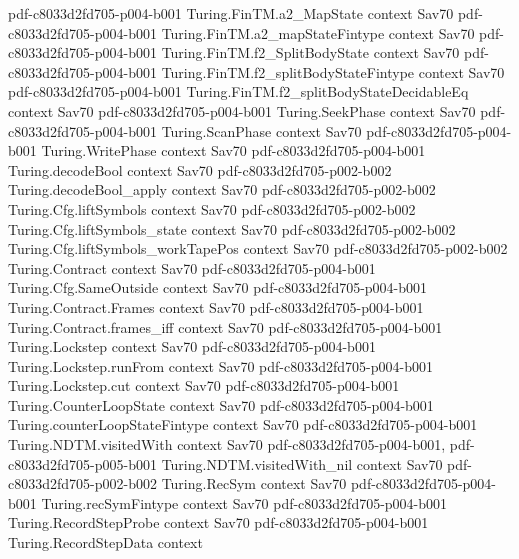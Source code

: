 \begin{theorem}
  {pdf-c8033d2fd705-p004-b001}
\proofstep
  {Turing.FinTM.a2_MapState}
  {context}
  {Sav70}
  {pdf-c8033d2fd705-p004-b001}
\proofstep
  {Turing.FinTM.a2_mapStateFintype}
  {context}
  {Sav70}
  {pdf-c8033d2fd705-p004-b001}
\proofstep
  {Turing.FinTM.f2_SplitBodyState}
  {context}
  {Sav70}
  {pdf-c8033d2fd705-p004-b001}
\proofstep
  {Turing.FinTM.f2_splitBodyStateFintype}
  {context}
  {Sav70}
  {pdf-c8033d2fd705-p004-b001}
\proofstep
  {Turing.FinTM.f2_splitBodyStateDecidableEq}
  {context}
  {Sav70}
  {pdf-c8033d2fd705-p004-b001}
\proofstep
  {Turing.SeekPhase}
  {context}
  {Sav70}
  {pdf-c8033d2fd705-p004-b001}
\proofstep
  {Turing.ScanPhase}
  {context}
  {Sav70}
  {pdf-c8033d2fd705-p004-b001}
\proofstep
  {Turing.WritePhase}
  {context}
  {Sav70}
  {pdf-c8033d2fd705-p004-b001}
\proofstep
  {Turing.decodeBool}
  {context}
  {Sav70}
  {pdf-c8033d2fd705-p002-b002}
\proofstep
  {Turing.decodeBool_apply}
  {context}
  {Sav70}
  {pdf-c8033d2fd705-p002-b002}
\proofstep
  {Turing.Cfg.liftSymbols}
  {context}
  {Sav70}
  {pdf-c8033d2fd705-p002-b002}
\proofstep
  {Turing.Cfg.liftSymbols_state}
  {context}
  {Sav70}
  {pdf-c8033d2fd705-p002-b002}
\proofstep
  {Turing.Cfg.liftSymbols_workTapePos}
  {context}
  {Sav70}
  {pdf-c8033d2fd705-p002-b002}
\proofstep
  {Turing.Contract}
  {context}
  {Sav70}
  {pdf-c8033d2fd705-p004-b001}
\proofstep
  {Turing.Cfg.SameOutside}
  {context}
  {Sav70}
  {pdf-c8033d2fd705-p004-b001}
\proofstep
  {Turing.Contract.Frames}
  {context}
  {Sav70}
  {pdf-c8033d2fd705-p004-b001}
\proofstep
  {Turing.Contract.frames_iff}
  {context}
  {Sav70}
  {pdf-c8033d2fd705-p004-b001}
\proofstep
  {Turing.Lockstep}
  {context}
  {Sav70}
  {pdf-c8033d2fd705-p004-b001}
\proofstep
  {Turing.Lockstep.runFrom}
  {context}
  {Sav70}
  {pdf-c8033d2fd705-p004-b001}
\proofstep
  {Turing.Lockstep.cut}
  {context}
  {Sav70}
  {pdf-c8033d2fd705-p004-b001}
\proofstep
  {Turing.CounterLoopState}
  {context}
  {Sav70}
  {pdf-c8033d2fd705-p004-b001}
\proofstep
  {Turing.counterLoopStateFintype}
  {context}
  {Sav70}
  {pdf-c8033d2fd705-p004-b001}
\proofstep
  {Turing.NDTM.visitedWith}
  {context}
  {Sav70}
  {pdf-c8033d2fd705-p004-b001,
    pdf-c8033d2fd705-p005-b001}
\proofstep
  {Turing.NDTM.visitedWith_nil}
  {context}
  {Sav70}
  {pdf-c8033d2fd705-p002-b002}
\proofstep
  {Turing.RecSym}
  {context}
  {Sav70}
  {pdf-c8033d2fd705-p004-b001}
\proofstep
  {Turing.recSymFintype}
  {context}
  {Sav70}
  {pdf-c8033d2fd705-p004-b001}
\proofstep
  {Turing.RecordStepProbe}
  {context}
  {Sav70}
  {pdf-c8033d2fd705-p004-b001}
\proofstep
  {Turing.RecordStepData}
  {context}

\end{theorem}
